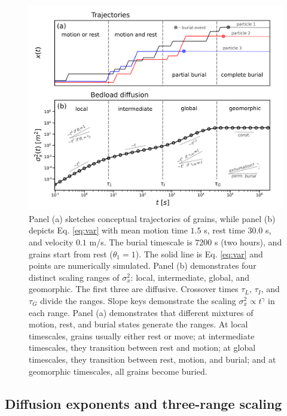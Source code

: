 \begin{figure}[!htbp]	
	\includegraphics[width=\linewidth,keepaspectratio]{./figures/ch4/diffusion.png}
	\caption{Panel (a) sketches conceptual trajectories of grains, while panel (b) depicts Eq. \ref{eq:var} with mean motion time $1.5$ s, rest time $30.0$ s, and velocity $0.1$ m/s. The burial timescale is $7200$ s (two hours), and grains start from rest ($\theta_1=1$). The solid line is Eq. \ref{eq:var} and points are numerically simulated. Panel (b) demonstrates four distinct scaling ranges of $\sigma_x^2$: local, intermediate, global, and geomorphic. The first three are diffusive. Crossover times $\tau_L$, $\tau_I$, and $\tau_G$ divide the ranges. Slope keys demonstrate the scaling $\sigma_x^2 \propto t^\gamma$ in each range. Panel (a) demonstrates that different mixtures of motion, rest, and burial states generate the ranges. At local timescales, grains usually either rest or move; at intermediate timescales, they transition between rest and motion; at global timescales, they transition between rest, motion, and burial; and at geomorphic timescales, all grains become buried.
	}
	\label{fig:diffvar}
\end{figure}

\subsection{Diffusion exponents and three-range scaling}
\label{sec:amidonenow}

